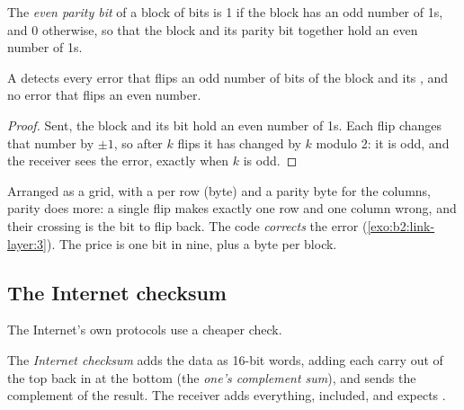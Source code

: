 \begin{definition}\label{def:b2:link-layer:parity}
The \emph{even parity bit} of a block of bits is 1 if the block has an odd number of 1s, and 0
otherwise, so that the block and its parity bit together hold an even number of 1s.
\end{definition}

\begin{proposition}[Parity]\label{prop:b2:link-layer:parity}
A  detects every error that flips an odd number of bits of the block and its , and no error that
flips an even number.
\end{proposition}

\begin{proof}
Sent, the block and its bit hold an even number of 1s. Each flip changes that number by $\pm 1$, so after $k$ flips
it has changed by $k$ modulo 2: it is odd, and the receiver sees the error, exactly when $k$ is odd.
\end{proof}

\label{out:b2:link-layer:parity}

Arranged as a grid, with a  per row (byte) and a parity byte for the columns, parity does more: a single
flip makes exactly one row and one column wrong, and their crossing is the bit to flip back. The code
\emph{corrects} the error (\cref{exo:b2:link-layer:3}). The price is one bit in nine, plus a byte per block.

\subsection{The Internet checksum}

The Internet's own protocols use a cheaper check.

\begin{definition}\label{def:b2:link-layer:inet-checksum}
The \emph{Internet checksum} adds the data as 16-bit words, adding each carry out of the top
back in at the bottom (the \emph{one's complement sum}), and sends the complement of the result. The receiver adds
everything,  included, and expects .
\end{definition}

